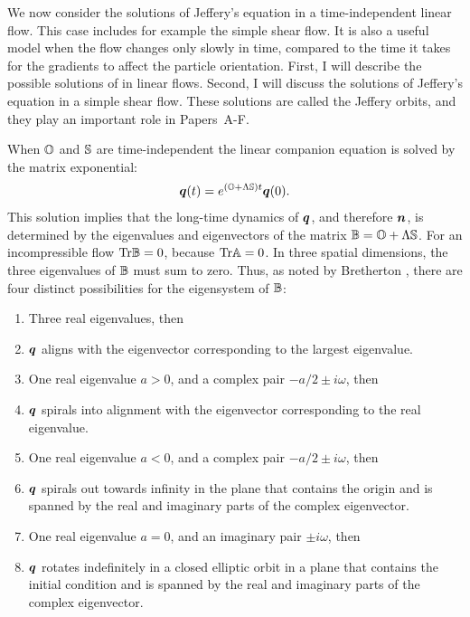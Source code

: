 \documentclass[thesis.tex]{subfiles}
\begin{document}
We now consider the solutions of Jeffery's equation in a time-independent linear flow. This case includes for example the simple shear flow. It is also a useful model when the flow changes only slowly in time, compared to the time it takes for the gradients to affect the particle orientation. First, I will describe the possible solutions of  in linear flows. Second, I will discuss the solutions of Jeffery's equation in a simple shear flow. These solutions are called the Jeffery orbits, and they play an important role in Papers~A-F.

When $\mathbb{O}$ and $\mathbb{S}$ are time-independent the linear companion equation  is solved by the matrix exponential:
\begin{align}
		\mbox{\boldmath$q$}(t) = e^{(\mathbb{O} + \Lambda \mathbb{S})t}\mbox{\boldmath$q$}(0).
\end{align}
This solution implies that the long-time dynamics of $\mbox{\boldmath$q$}$, and therefore $\mbox{\boldmath$n$}$, is determined by the eigenvalues and eigenvectors of the matrix $\mathbb{B} = \mathbb{O} + \Lambda\mathbb{S}$. For an incompressible flow $\mbox{Tr}\mathbb{B}=0$, because $\mbox{Tr}\mathbb{A}=0$. In three spatial dimensions, the three eigenvalues of $\mathbb{B}$ must sum to zero. Thus, as noted by Bretherton \cite{bretherton1962}, there are four distinct possibilities for the eigensystem of $\mathbb{B}$:
\begin{enumerate}
	\item Three real eigenvalues, then
	\item[] $\mbox{\boldmath$q$}$ aligns with the eigenvector corresponding to the largest eigenvalue.
	\item One real eigenvalue $a>0$, and a complex pair $-a/2 \pm i\omega$, then
	\item[] $\mbox{\boldmath$q$}$ spirals into alignment with the eigenvector corresponding to the real eigenvalue.
	\item One real eigenvalue $a<0$, and a complex pair $-a/2 \pm i\omega$, then
	\item[] $\mbox{\boldmath$q$}$ spirals out towards infinity in the plane that contains the origin and is spanned by the real and imaginary parts of the complex eigenvector.
	\item One real eigenvalue $a=0$, and an imaginary pair $\pm i\omega$, then
	\item[] $\mbox{\boldmath$q$}$ rotates indefinitely in a closed elliptic orbit in a plane that contains the initial condition and is spanned by the real and imaginary parts of the complex eigenvector.
\end{enumerate}
\end{document}
